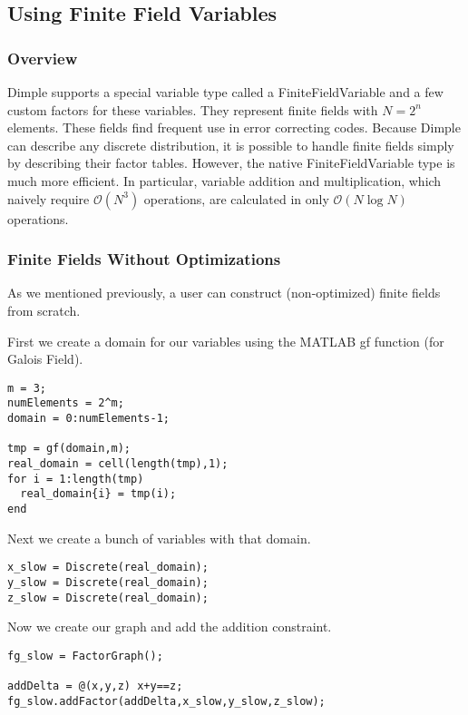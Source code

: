 \subsection{Using Finite Field Variables}
\label{sec:finiteFields}


\subsubsection{Overview}

Dimple supports a special variable type called a FiniteFieldVariable and a few custom factors for these variables. They represent finite fields with $N=2^{n}$ elements. These fields find frequent use in error correcting codes. Because Dimple can describe any discrete distribution, it is possible to handle finite fields simply by describing their factor tables. However, the native FiniteFieldVariable type is much more efficient. In particular, variable addition and multiplication, which naively require $\mathcal{O}(N^{3})$ operations, are calculated in only $\mathcal{O}(N\log N)$ operations.

\subsubsection{Finite Fields Without Optimizations}

As we mentioned previously, a user can construct (non-optimized) finite fields from scratch.

First we create a domain for our variables using the MATLAB gf function (for Galois Field).

\begin{lstlisting}
m = 3; 
numElements = 2^m;
domain = 0:numElements-1;

tmp = gf(domain,m); 
real_domain = cell(length(tmp),1);
for i = 1:length(tmp)
  real_domain{i} = tmp(i); 
end
\end{lstlisting}

Next we create a bunch of variables with that domain.

\begin{lstlisting}
x_slow = Discrete(real_domain);
y_slow = Discrete(real_domain); 
z_slow = Discrete(real_domain);
\end{lstlisting}

Now we create our graph and add the addition constraint.

\begin{lstlisting}
fg_slow = FactorGraph();

addDelta = @(x,y,z) x+y==z;
fg_slow.addFactor(addDelta,x_slow,y_slow,z_slow);
\end{lstlisting}

